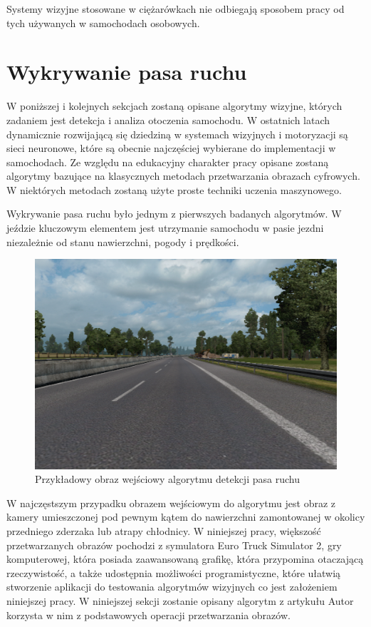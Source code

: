 Systemy wizyjne stosowane w ciężarówkach nie odbiegają sposobem pracy od tych używanych w samochodach osobowych.

\section{Wykrywanie pasa ruchu}
\label{sec:lane_detection}
W poniższej i kolejnych sekcjach zostaną opisane algorytmy wizyjne, których zadaniem jest detekcja i analiza otoczenia samochodu. W ostatnich latach dynamicznie rozwijającą się dziedziną w systemach wizyjnych i motoryzacji są sieci neuronowe, które są obecnie najczęściej wybierane do implementacji w samochodach. Ze względu na edukacyjny charakter pracy opisane zostaną algorytmy bazujące na klasycznych metodach przetwarzania obrazach cyfrowych. W niektórych metodach zostaną użyte proste techniki uczenia maszynowego.

Wykrywanie pasa ruchu było jednym z pierwszych badanych algorytmów. W jeździe kluczowym elementem jest utrzymanie samochodu w pasie jezdni niezależnie od stanu nawierzchni, pogody i prędkości.

\begin{figure}
  \centering
  \includegraphics[width=12cm]{img/input.png}
  \caption{Przykładowy obraz wejściowy algorytmu detekcji pasa ruchu}
  \label{fig:inputimg}
\end{figure}

W najczęstszym przypadku obrazem wejściowym do algorytmu jest obraz z kamery umieszczonej pod pewnym kątem do nawierzchni zamontowanej w okolicy przedniego zderzaka lub atrapy chłodnicy. W niniejszej pracy, większość przetwarzanych obrazów pochodzi z symulatora Euro Truck Simulator 2, gry komputerowej, która posiada zaawansowaną grafikę, która przypomina otaczającą rzeczywistość, a także udostępnia możliwości programistyczne, które ułatwią stworzenie aplikacji do testowania algorytmów wizyjnych co jest założeniem niniejszej pracy. W niniejszej sekcji zostanie opisany algorytm z artykułu \cite{T3}
Autor korzysta w nim z podstawowych operacji przetwarzania obrazów. 




